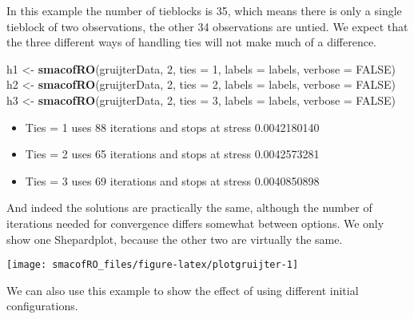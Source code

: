 \documentclass[
  12pt,
]{article}
\newenvironment{Shaded}{\begin{snugshade}}{\end{snugshade}}
\newcommand{\AttributeTok}[1]{\textcolor[rgb]{0.13,0.29,0.53}{#1}}
\newcommand{\ConstantTok}[1]{\textcolor[rgb]{0.56,0.35,0.01}{#1}}
\newcommand{\DecValTok}[1]{\textcolor[rgb]{0.00,0.00,0.81}{#1}}
\newcommand{\FunctionTok}[1]{\textcolor[rgb]{0.13,0.29,0.53}{\textbf{#1}}}
\newcommand{\NormalTok}[1]{#1}
\newcommand{\OtherTok}[1]{\textcolor[rgb]{0.56,0.35,0.01}{#1}}
\providecommand{\tightlist}{%
  \setlength{\itemsep}{0pt}\setlength{\parskip}{0pt}}
\begin{document}
In this example the number of tieblocks is 35, which means
there is only a single tieblock of two observations, the other 34 observations are
untied. We expect that the three different ways of handling ties will not make
much of a difference.

\begin{Shaded}
\begin{Highlighting}[]
\NormalTok{h1 }\OtherTok{\textless{}{-}} \FunctionTok{smacofRO}\NormalTok{(gruijterData, }\DecValTok{2}\NormalTok{, }\AttributeTok{ties =} \DecValTok{1}\NormalTok{, }\AttributeTok{labels =}\NormalTok{ labels, }\AttributeTok{verbose =} \ConstantTok{FALSE}\NormalTok{)}
\NormalTok{h2 }\OtherTok{\textless{}{-}} \FunctionTok{smacofRO}\NormalTok{(gruijterData, }\DecValTok{2}\NormalTok{, }\AttributeTok{ties =} \DecValTok{2}\NormalTok{, }\AttributeTok{labels =}\NormalTok{ labels, }\AttributeTok{verbose =} \ConstantTok{FALSE}\NormalTok{)}
\NormalTok{h3 }\OtherTok{\textless{}{-}} \FunctionTok{smacofRO}\NormalTok{(gruijterData, }\DecValTok{2}\NormalTok{, }\AttributeTok{ties =} \DecValTok{3}\NormalTok{, }\AttributeTok{labels =}\NormalTok{ labels, }\AttributeTok{verbose =} \ConstantTok{FALSE}\NormalTok{)}
\end{Highlighting}
\end{Shaded}

\begin{itemize}
\tightlist
\item
  Ties = 1 uses 88 iterations and stops at stress 0.0042180140
\item
  Ties = 2 uses 65 iterations and stops at stress 0.0042573281
\item
  Ties = 3 uses 69 iterations and stops at stress 0.0040850898
\end{itemize}

And indeed the solutions are practically the same, although the number of iterations needed for convergence
differs somewhat between options. We only show one Shepardplot, because the other two are virtually the same.

\begin{center}\texttt{[image: smacofRO\_files/figure-latex/plotgruijter-1]} \end{center}

We can also use this example to show the effect of using different initial configurations.
\end{document}

